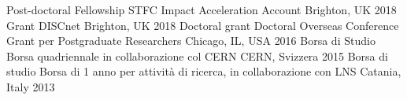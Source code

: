 
\begin{cvhonors}
  \cvhonor 
      {Post-doctoral Fellowship}
      {STFC Impact Acceleration Account}
      {Brighton, UK}
      {2018}
  \cvhonor 
      {Grant}
      {DISCnet}
      {Brighton, UK}
      {2018}
  \cvhonor
      {Doctoral grant}
      {Doctoral Overseas Conference Grant per Postgraduate Researchers}
      {Chicago, IL, USA}
      {2016}
  \cvhonor
      {Borsa di Studio}
      {Borsa quadriennale in collaborazione col CERN}
      {CERN, Svizzera}
      {2015}
  \cvhonor
      {Borsa di studio}
      {Borsa di 1 anno per attività di ricerca, in collaborazione con LNS}
      {Catania, Italy}
      {2013}
\end{cvhonors}